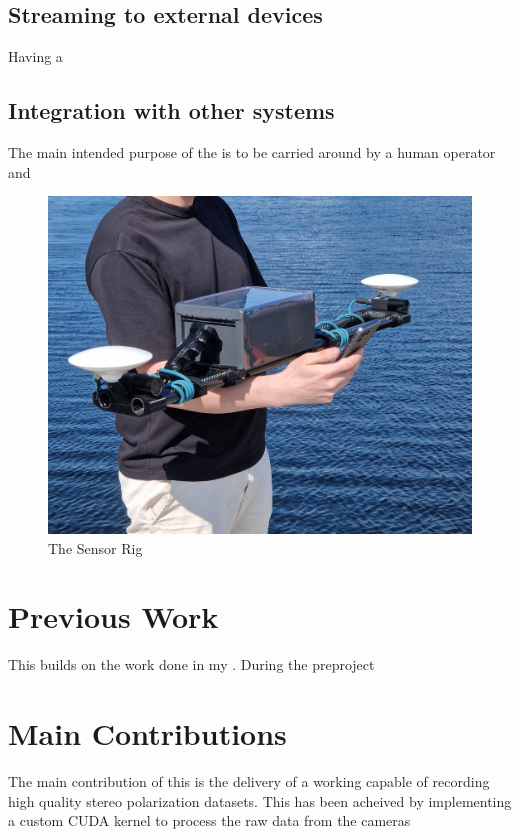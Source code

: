 \subsection{Streaming to external devices}
Having a

\subsection{Integration with other systems}
The main intended purpose of the \sr is to be carried around by a human operator and


\begin{figure}[H]
    \includegraphics[width=\textwidth]{figures/frontpage.jpg}
    \caption{The Sensor Rig}
\end{figure}



\section{Previous Work}
This \masters builds on the work done in my \preproject \cite{martensPortableSensorRig2022}.
During the preproject


\section{Main Contributions}
The main contribution of this \master is the delivery of a working \sr capable of recording high quality stereo polarization datasets.
This has been acheived by implementing a custom CUDA kernel to process the raw data from the cameras


